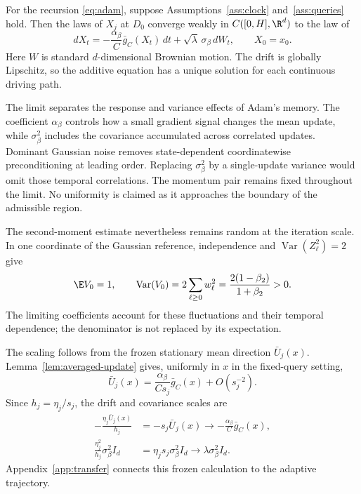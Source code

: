 \begin{theorem}\label{thm:diffusion}
For the recursion \eqref{eq:adam}, suppose Assumptions~\ref{ass:clock}
and~\ref{ass:queries} hold. Then the laws of $X_j$ at $D_0$ converge weakly in
$C([0,H],\R^d)$ to the law of
\begin{equation}\label{eq:sde}
 dX_t=-\frac{\alpha_\beta}{C}\bar g_C(X_t)\,dt
       +\sqrt{\lambda}\,\sigma_\beta\,dW_t,\qquad X_0=x_0.
\end{equation}
Here $W$ is standard $d$-dimensional Brownian motion.
The drift is globally Lipschitz, so the additive equation has a unique
solution for each continuous driving path.
\end{theorem}

The limit separates the response and variance effects of Adam's memory.
The coefficient $\alpha_\beta$ controls how a small gradient signal changes
the mean update, while $\sigma_\beta^2$ includes the covariance accumulated across
correlated updates. Dominant Gaussian noise removes state-dependent
coordinatewise preconditioning at leading order. Replacing $\sigma_\beta^2$ by a
single-update variance would omit those temporal correlations. The
momentum pair remains fixed throughout the limit. No uniformity is
claimed as it approaches the boundary of the admissible region.

The second-moment estimate nevertheless remains random at the iteration
scale. In one coordinate of the Gaussian reference, independence and
$\operatorname{Var}(Z_{\ell}^2)=2$ give
\[
 \E V_0=1,\qquad
 \operatorname{Var}(V_0)=2\sum_{\ell\geq0}w_{\ell}^2
 =\frac{2(1-\beta_2)}{1+\beta_2}>0.
\]
The limiting coefficients account for these fluctuations and their temporal
dependence; the denominator is not replaced by its expectation.

The scaling follows from the frozen stationary mean direction $\bar U_j(x)$.
Lemma~\ref{lem:averaged-update} gives, uniformly in $x$ in the fixed-query setting,
\[
 \bar U_j(x)=\frac{\alpha_\beta}{Cs_j}\bar g_C(x)+O(s_j^{-2}).
\]
Since $h_j=\eta_j/s_j$, the drift and covariance scales are
\[
 \begin{aligned}
 -\frac{\eta_j\bar U_j(x)}{h_j}
 &=-s_j\bar U_j(x)\longrightarrow-\frac{\alpha_\beta}{C}\bar g_C(x),\\
 \frac{\eta_j^2}{h_j}\sigma_\beta^2I_d
 &=\eta_js_j\sigma_\beta^2I_d\longrightarrow\lambda\sigma_\beta^2I_d.
 \end{aligned}
\]
Appendix~\ref{app:transfer} connects this frozen calculation to the
adaptive trajectory.

